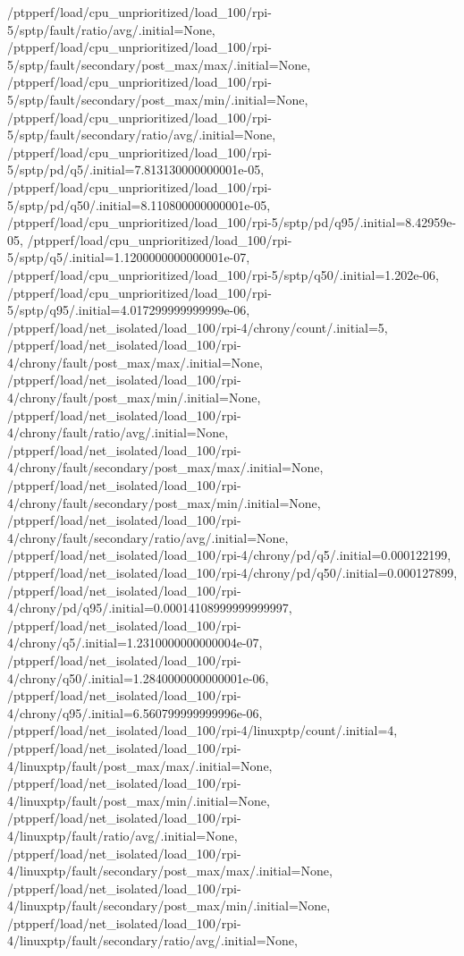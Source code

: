 {    /ptpperf/load/cpu_unprioritized/load_100/rpi-5/sptp/fault/ratio/avg/.initial=None,
    /ptpperf/load/cpu_unprioritized/load_100/rpi-5/sptp/fault/secondary/post_max/max/.initial=None,
    /ptpperf/load/cpu_unprioritized/load_100/rpi-5/sptp/fault/secondary/post_max/min/.initial=None,
    /ptpperf/load/cpu_unprioritized/load_100/rpi-5/sptp/fault/secondary/ratio/avg/.initial=None,
    /ptpperf/load/cpu_unprioritized/load_100/rpi-5/sptp/pd/q5/.initial=7.813130000000001e-05,
    /ptpperf/load/cpu_unprioritized/load_100/rpi-5/sptp/pd/q50/.initial=8.110800000000001e-05,
    /ptpperf/load/cpu_unprioritized/load_100/rpi-5/sptp/pd/q95/.initial=8.42959e-05,
    /ptpperf/load/cpu_unprioritized/load_100/rpi-5/sptp/q5/.initial=1.1200000000000001e-07,
    /ptpperf/load/cpu_unprioritized/load_100/rpi-5/sptp/q50/.initial=1.202e-06,
    /ptpperf/load/cpu_unprioritized/load_100/rpi-5/sptp/q95/.initial=4.017299999999999e-06,
    /ptpperf/load/net_isolated/load_100/rpi-4/chrony/count/.initial=5,
    /ptpperf/load/net_isolated/load_100/rpi-4/chrony/fault/post_max/max/.initial=None,
    /ptpperf/load/net_isolated/load_100/rpi-4/chrony/fault/post_max/min/.initial=None,
    /ptpperf/load/net_isolated/load_100/rpi-4/chrony/fault/ratio/avg/.initial=None,
    /ptpperf/load/net_isolated/load_100/rpi-4/chrony/fault/secondary/post_max/max/.initial=None,
    /ptpperf/load/net_isolated/load_100/rpi-4/chrony/fault/secondary/post_max/min/.initial=None,
    /ptpperf/load/net_isolated/load_100/rpi-4/chrony/fault/secondary/ratio/avg/.initial=None,
    /ptpperf/load/net_isolated/load_100/rpi-4/chrony/pd/q5/.initial=0.000122199,
    /ptpperf/load/net_isolated/load_100/rpi-4/chrony/pd/q50/.initial=0.000127899,
    /ptpperf/load/net_isolated/load_100/rpi-4/chrony/pd/q95/.initial=0.00014108999999999997,
    /ptpperf/load/net_isolated/load_100/rpi-4/chrony/q5/.initial=1.2310000000000004e-07,
    /ptpperf/load/net_isolated/load_100/rpi-4/chrony/q50/.initial=1.2840000000000001e-06,
    /ptpperf/load/net_isolated/load_100/rpi-4/chrony/q95/.initial=6.560799999999996e-06,
    /ptpperf/load/net_isolated/load_100/rpi-4/linuxptp/count/.initial=4,
    /ptpperf/load/net_isolated/load_100/rpi-4/linuxptp/fault/post_max/max/.initial=None,
    /ptpperf/load/net_isolated/load_100/rpi-4/linuxptp/fault/post_max/min/.initial=None,
    /ptpperf/load/net_isolated/load_100/rpi-4/linuxptp/fault/ratio/avg/.initial=None,
    /ptpperf/load/net_isolated/load_100/rpi-4/linuxptp/fault/secondary/post_max/max/.initial=None,
    /ptpperf/load/net_isolated/load_100/rpi-4/linuxptp/fault/secondary/post_max/min/.initial=None,
    /ptpperf/load/net_isolated/load_100/rpi-4/linuxptp/fault/secondary/ratio/avg/.initial=None,
}
